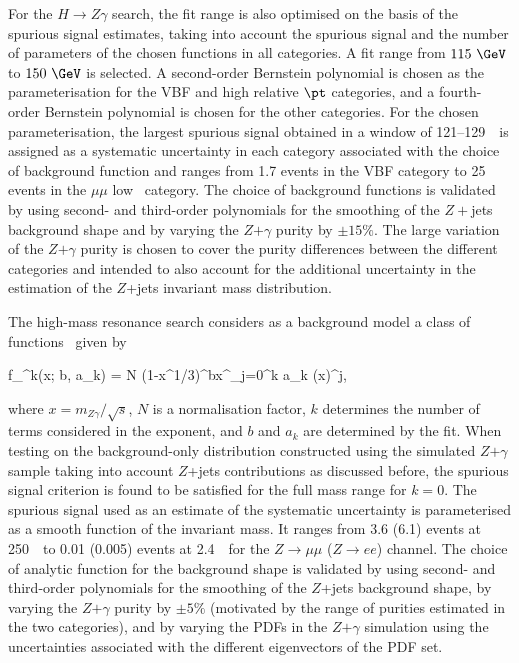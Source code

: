 For the $H\to Z\gamma$ search, the fit range is also optimised on the basis of the spurious signal
estimates, taking into account the spurious signal and the number of parameters of the chosen functions
in all categories. A fit range from $115~\GeV$ to $150~\GeV$ is selected. 
A second-order Bernstein polynomial
is chosen as the parameterisation for the VBF and high relative $\pt$ categories, and a fourth-order
Bernstein polynomial is chosen for the other categories. For the chosen parameterisation, the largest spurious 
signal obtained in a window of 121--129~\GeV\ is
assigned as a systematic uncertainty in each category associated with the choice of background 
function and ranges from
1.7 events in the VBF category to 25 events in the $\mu\mu$ low \ptt\ category.
The choice of background functions is validated by using second- and third-order polynomials for the
smoothing of the $Z+$jets background shape and by varying the $Z$$+$$\gamma$ purity by $\pm 15\%$.
The large variation of the $Z$$+$$\gamma$ purity is chosen to cover the purity differences between
the different categories and intended to also account for the additional uncertainty in the estimation
of the $Z$+jets invariant mass distribution.

The high-mass resonance search considers as a background model a class of functions~\cite{Aaboud:2016trl} given by

\beq
f_^k(x; b, {a_k}) = N (1-x^{1/3})^{b}x^{\sum_{j=0}^k a_k \log(x)^j},
\label{eqn:background}
\eeq

where $x= m_{Z\gamma}/\sqrt{s}$, $N$ is a normalisation factor, $k$ determines the number of terms considered in the exponent, and
$b$ and $a_k$ are determined by the fit. 
When testing on the background-only distribution constructed using the simulated $Z$$+$$\gamma$ 
sample taking into account $Z$+jets contributions as discussed before, the spurious signal
criterion is found to be satisfied for the full mass range for $k=0$.
The spurious signal used as an estimate of the systematic uncertainty is parameterised as a smooth function
of the invariant mass. It ranges from 3.6 (6.1) events at 250~\GeV\ to 0.01 (0.005) events at 2.4~\TeV\ for the
$Z\to\mu\mu$ ($Z\to ee$) channel.
The choice of analytic function for the background shape is validated by
using second- and third-order polynomials for the
smoothing of the $Z$+jets background shape, by varying the $Z$$+$$\gamma$ purity by $\pm 5\%$ (motivated by the
range of purities estimated in the two categories), and
by varying the PDFs in the $Z$$+$$\gamma$ simulation 
using the uncertainties associated with the different eigenvectors of the PDF set.


